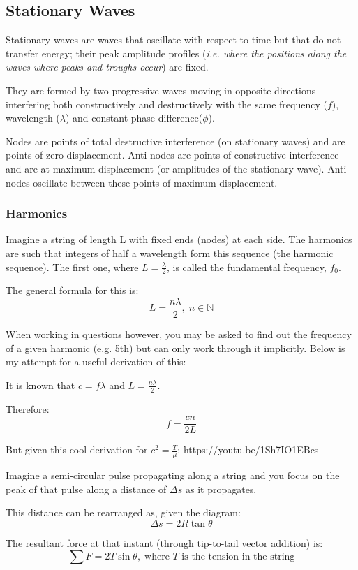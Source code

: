 \documentclass{article}
\begin{document}
\subsection{Stationary Waves}
Stationary waves are waves that oscillate with respect to time but that do not transfer energy; their peak amplitude profiles (\textit{i.e. where the positions along the waves where peaks and troughs occur}) are fixed.

They are formed by two progressive waves moving in opposite directions interfering both constructively and destructively with the same frequency ($f$), wavelength ($\lambda$) and constant phase difference($\phi$). 

Nodes are points of total destructive interference (on stationary waves) and are points of zero displacement. Anti-nodes are points of constructive interference and are at maximum displacement (or amplitudes of the stationary wave). Anti-nodes oscillate between these points of maximum displacement.

\subsubsection{Harmonics}
Imagine a string of length L with fixed ends (nodes) at each side. The harmonics are such that integers of half a wavelength form this sequence (the harmonic sequence). The first one, where $L = \frac{\lambda}{2}$, is called the fundamental frequency, $f_0$.

The general formula for this is: 
$$L = \frac{n\lambda}{2}, \; n \in \mathbb{N}$$

When working in questions however, you may be asked to find out the frequency of a given harmonic (e.g. 5th) but can only work through it implicitly. Below is my attempt for a useful derivation of this:

It is known that $c = f\lambda$ and $L = \frac{n\lambda}{2}$. 

Therefore:
$$f = \frac{cn}{2L}$$

But given this cool derivation for $c^2 = \frac{T}{\mu}$:
https://youtu.be/1Sh7IO1EBcs

Imagine a semi-circular pulse propagating along a string and you focus on the peak of that pulse along a distance of $\Delta s$ as it propagates. 

This distance can be rearranged as, given the diagram: 
$$\Delta s = 2R\tan{\theta}$$

The resultant force at that instant (through tip-to-tail vector addition) is: 
$$\sum{F} = 2T\sin{\theta}, \; \text{where $T$ is the tension in the string}$$
\end{document}
